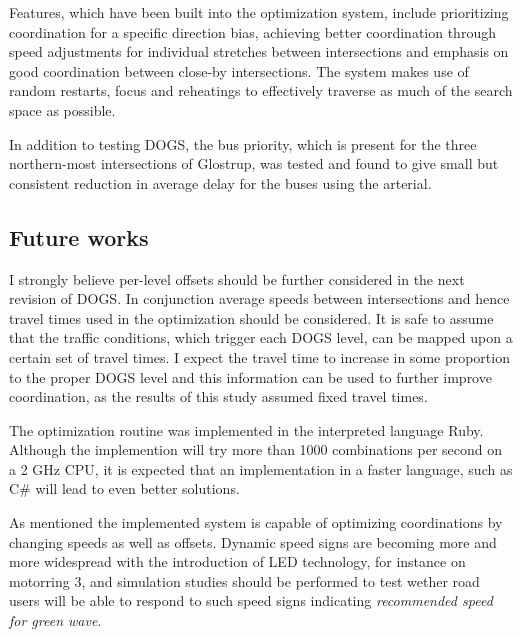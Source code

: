 Features, which have been built into the optimization system, include prioritizing coordination for a specific direction bias, achieving better coordination through speed adjustments for individual stretches between intersections and emphasis on good coordination between close-by intersections. The system makes use of random restarts, focus and reheatings to effectively traverse as much of the search space as possible.

In addition to testing DOGS, the bus priority, which is present for the three northern-most intersections of Glostrup, was tested and found to give small but consistent reduction in average delay for the buses using the arterial.

\subsection{Future works}
I strongly believe per-level offsets should be further considered in the next revision of DOGS. In conjunction average speeds between intersections and hence travel times used in the optimization should be considered. It is safe to assume that the traffic conditions, which trigger each DOGS level, can be mapped upon a certain set of travel times. I expect the travel time to increase in some proportion to the proper DOGS level and this information can be used to further improve coordination, as the results of this study assumed fixed travel times.

The optimization routine was implemented in the interpreted language Ruby. Although the implemention will try more than 1000 combinations per second on a 2 GHz CPU, it is expected that an implementation in a faster language, such as C\# will lead to even better solutions.

As mentioned the implemented system is capable of optimizing coordinations by changing speeds as well as offsets. Dynamic speed signs are becoming more and more widespread with the introduction of LED technology, for instance on motorring 3, and simulation studies should be performed to test wether road users will be able to respond to such speed signs indicating \textit{recommended speed for green wave}.

